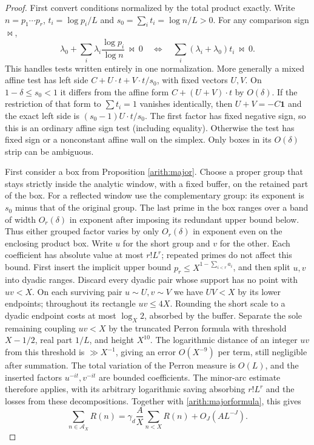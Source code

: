 \documentclass[11pt,a4paper]{article}
\theoremstyle{paperplain}
\numberwithin{equation}{section}
\begin{document}
\begin{proof}
First convert conditions normalized by the total product exactly.
Write $n=p_1\cdots p_r$, $t_i=\log p_i/L$ and
$s_0=\sum_i t_i=\log n/L>0$. For any comparison sign $\bowtie$,
\begin{equation}\label{arith:homogenize}
 \lambda_0+\sum_i\lambda_i\frac{\log p_i}{\log n}\ \bowtie\ 0
 \quad\Longleftrightarrow\quad
 \sum_i(\lambda_i+\lambda_0)t_i\ \bowtie\ 0.
\end{equation}
This handles tests written entirely in one normalization. More generally
a mixed affine test has left side $C+U\cdot t+V\cdot t/s_0$, with fixed
vectors $U,V$. On $1-\delta\le s_0<1$ it differs from the affine form
$C+(U+V)\cdot t$ by $O(\delta)$. If the restriction of that form to
$\sum t_i=1$ vanishes identically, then $U+V=-C\mathbf1$ and the exact
left side is $(s_0-1)U\cdot t/s_0$. The first factor has fixed negative
sign, so this is an ordinary affine sign test (including equality).
Otherwise the test has fixed sign or a nonconstant affine wall on the
simplex. Only boxes in its $O(\delta)$ strip can be ambiguous.

First consider a box from Proposition \ref{arith:major}.
Choose a proper group that stays strictly inside the analytic window,
with a fixed buffer, on the retained part of the box. For a reflected
window use the complementary group: its exponent is $s_0$ minus that
of the original group. The last prime in the box ranges over a band of
width $O_r(\delta)$ in exponent after imposing its redundant upper bound
below. Thus either grouped factor varies by only $O_r(\delta)$ in
exponent even on the enclosing product box. Write $u$ for the short
group and $v$ for the other.
Each coefficient has absolute value at most $r!L^r$; repeated primes
do not affect this bound.
First insert the implicit upper bound $p_r\le X^{1-\sum_{i<r}a_i}$,
and then split $u,v$ into dyadic ranges.
Discard every dyadic pair whose support has no point with $uv<X$.
On each surviving pair $u\sim U,v\sim V$ we have $UV<X$ by its lower
endpoints; throughout its rectangle $uv\le4X$. Rounding the short scale
to a dyadic endpoint costs at most $\log_X2$, absorbed by the buffer.
Separate the sole remaining coupling $uv<X$ by the truncated Perron
formula with threshold $X-1/2$, real part $1/L$, and height $X^{10}$.
The logarithmic distance of an integer $uv$ from this threshold is
$\gg X^{-1}$, giving an error $O(X^{-9})$ per term, still negligible
after summation.
The total variation of the Perron measure is $O(L)$, and the inserted
factors $u^{-it},v^{-it}$ are bounded coefficients.
The minor-arc estimate therefore applies, with its arbitrary logarithmic
saving absorbing $r!L^r$ and the losses from these decompositions.
Together with \eqref{arith:majorformula}, this gives
\begin{equation}\label{arith:boxcomparison}
 \sum_{n\in\mathcal A_X}R(n)
 =\gamma_d\frac AX\sum_{n<X}R(n)+O_J(AL^{-J}).
\end{equation}


\end{proof}
\end{document}

